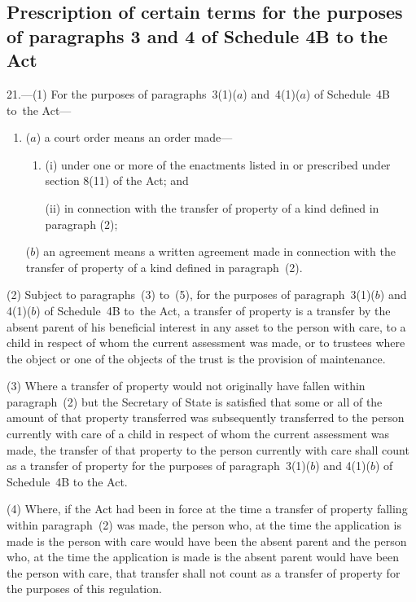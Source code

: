 \documentclass[12pt,a4paper]{article}
\begin{document}
\subsection[21. Prescription of certain terms for the
purposes of paragraphs~3 and~4 of Schedule~4B to~the Act]{Prescription of certain terms for the
purposes of paragraphs 3 and 4 of Schedule 4B to the Act}

21.—(1) For the purposes
of paragraphs~3(1)($a$) and~4(1)($a$) of Schedule~4B to~the Act—
\begin{enumerate}\item[]
($a$) a court order means an order made—
\begin{enumerate}\item[]
(i) under one or more of the enactments listed in or prescribed under section
8(11) of the Act; and

(ii) in connection with the transfer of property of a kind defined in paragraph
(2);
\end{enumerate}

($b$) an agreement means a written agreement made in connection with the transfer
of property of a kind defined in paragraph~(2).
\end{enumerate}

(2) Subject to paragraphs~(3) to~(5), for the purposes of paragraph~3(1)($b$) and
4(1)($b$) of Schedule~4B to~the Act, a transfer of property is a transfer by the
absent parent of his beneficial interest in any asset to the person with care,
to a child in respect of whom the current assessment was made, or to trustees
where the object or one of the objects of the trust is the provision of
maintenance.%

(3) Where a transfer of property would not originally have fallen within
paragraph~(2) but the Secretary of State is satisfied that some or all of the
amount of that property transferred was subsequently transferred to the person
currently with care of a child in respect of whom the current assessment was
made, the transfer of that property to the person currently with care shall
count as a transfer of property for the purposes of paragraph~3(1)($b$) and
4(1)($b$) of Schedule~4B to the Act.

(4) Where, if the Act had been in force at the time a transfer of property
falling within paragraph~(2) was made, the person who, at the time the
application is made is the person with care would have been the absent parent
and the person who, at the time the application is made is the absent parent
would have been the person with care, that transfer shall not count as a
transfer of property for the purposes of this regulation.
\end{document}
